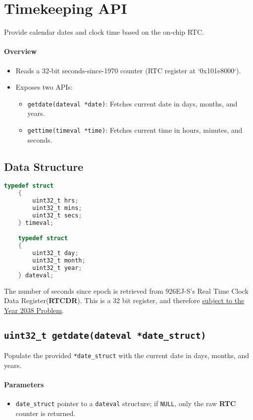 \newpage
\section{Timekeeping API}
Provide calendar dates and clock time based on the on-chip RTC.

\paragraph{Overview}
\begin{itemize}
    \item Reads a 32-bit seconds-since-1970 counter (RTC register at `0x101e8000`).
    \item Exposes two APIs:
    \begin{itemize}
        \item \texttt{getdate(dateval *date)}: Fetches current date in days, months, and years.
        \item \texttt{gettime(timeval *time)}: Fetches current time in hours, minutes, and seconds.
    \end{itemize}
\end{itemize}

\subsection*{Data Structure}

\begin{lstlisting}[language=C, caption={Structure definitions for time and date values.}, label={lst:datetime_structs}]
    typedef struct
    {
        uint32_t hrs;
        uint32_t mins;
        uint32_t secs;
    } timeval;

    typedef struct
    {
        uint32_t day;
        uint32_t month;
        uint32_t year;
    } dateval;
\end{lstlisting}

\noindent
The number of seconds since epoch is retrieved from 926EJ-S's Real Time Clock 
Data Register(\textbf{RTCDR}). This is a 32 bit register, and therefore 
\underline{subject to the Year 2038 Problem}.

\subsection{\texttt{uint32\_t getdate(dateval *date\_struct)}}
Populate the provided \texttt{*date\_struct} with the current date in days, months, and years.

\paragraph{Parameters}
\begin{itemize}
    \item \texttt{date\_struct} pointer to a \texttt{dateval} structure; if \texttt{NULL}, 
    only the raw \textbf{RTC} counter is returned.
\end{itemize}

